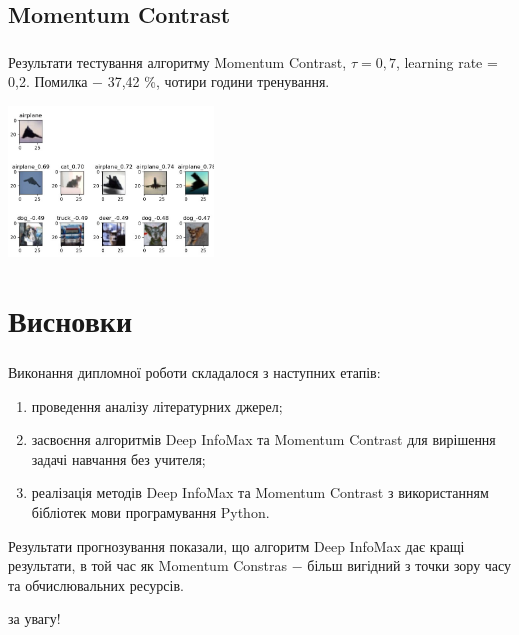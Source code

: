\documentclass[c]{beamer}
\begin{document}
\subsection{Momentum Contrast}

\begin{frame}
	\frametitle{\insertsection}
	\framesubtitle{\insertsubsection}

	Результати тестування алгоритму Momentum Contrast, $\tau = 0,7$, learning rate = 0,2. Помилка $-$ 37,42 \%, чотири години тренування.
	
    \includegraphics[width=\textwidth, height=4cm, natwidth=621, natheight=456]{mocodemo3.jpg}

\end{frame}

\section{Висновки}

\begin{frame}
	\frametitle{\insertsection}
	Виконання дипломної роботи складалося з наступних етапів:

	\begin{enumerate}
		\item проведення аналізу літературних джерел;\pause
		\item засвоєння алгоритмів Deep InfoMax та Momentum Contrast для вирішення задачі навчання без учителя;\pause
		\item реалізація методів Deep InfoMax та Momentum Contrast з використанням бібліотек мови програмування Python.\pause
	\end{enumerate}

	Результати прогнозування показали, що алгоритм Deep InfoMax дає кращі результати, в той час як Momentum Constras $-$ більш вигідний з точки зору часу та обчислювальних ресурсів.
\end{frame}

\begin{frame}
	\centering{} за увагу!
\end{frame}
\end{document}
